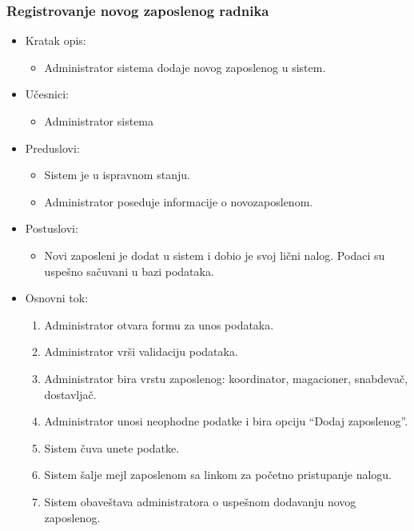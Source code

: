 \subsubsection{Registrovanje novog zaposlenog radnika}

\begin{itemize}
    \item Kratak opis:
        \begin{itemize}
            \item Administrator sistema dodaje novog zaposlenog u sistem.
        \end{itemize}
    \item Učesnici:
        \begin{itemize}
            \item Administrator sistema
        \end{itemize}
    \item Preduslovi:
        \begin{itemize}
            \item Sistem je u ispravnom stanju.
            \item Administrator poseduje informacije o novozaposlenom.
        \end{itemize}
    \item Postuslovi:
        \begin{itemize}
            \item Novi zaposleni je dodat u sistem i dobio je svoj lični nalog. Podaci su uspešno sačuvani u bazi podataka.
        \end{itemize}
    \item Osnovni tok:
        \begin{enumerate}
         \item Administrator otvara formu za unos podataka.
         \item Administrator vrši validaciju podataka.
         \item Administrator bira vrstu zaposlenog: koordinator, magacioner, snabdevač, dostavljač.
         \item Administrator unosi neophodne podatke i bira opciju ``Dodaj zaposlenog''.
         \item Sistem čuva unete podatke.
         \item Sistem šalje mejl zaposlenom sa linkom za početno pristupanje nalogu.
         \item Sistem obaveštava administratora o uspešnom dodavanju novog zaposlenog.
        \end{enumerate}

\end{itemize}
